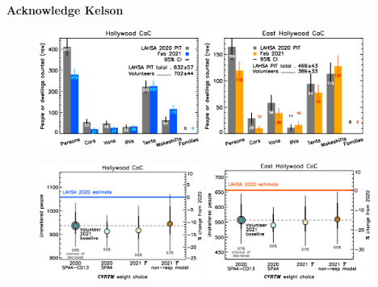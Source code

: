\documentclass[11pt]{article}
\def\bfr{\bf\color{red}}
\begin{document}
{\bfr Acknowledge Kelson}

\begin{figure}[h]
	\centering
	\includegraphics[width = 0.47\textwidth, trim = 1cm 0cm 0cm 0cm]{Hwood2021Bars}
	\includegraphics[width = 0.47\textwidth, trim = 1cm 0cm 0cm 0cm]{Eho2021Bars}
	\caption{}
	\label{fig:rawCounts}
\end{figure}

\begin{figure}[]
	\centering
	\includegraphics[width = 0.48\textwidth, trim = 1cm 0cm 0cm 1cm]{hwoodFinal}
	\includegraphics[width = 0.48\textwidth, trim = 1cm 0cm 0cm 1cm]{ehoFinal}
	\caption{}
	\label{fig:tcomp}
\end{figure}
\end{document}

